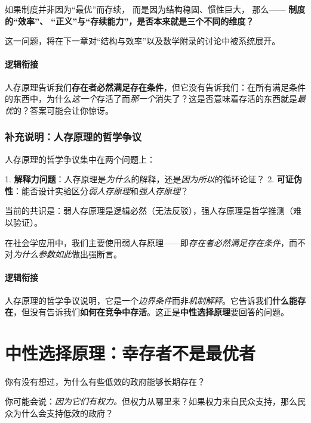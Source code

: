 \documentclass[openany, a4paper, 12pt]{book}
\begin{document}
	如果制度并非因为“最优”而存续，  
	而是因为结构稳固、惯性巨大，  
	那么——  
	\textbf{制度的“效率”、 “正义”与“存续能力”，是否本来就是三个不同的维度？}
	
	这一问题，将在下一章对“结构与效率”以及数学附录的讨论中被系统展开。
	
	

	\paragraph*{逻辑衔接}
	人存原理告诉我们\textbf{存在者必然满足存在条件}，但它没有告诉我们：在所有满足条件的东西中，为什么\textit{这一个}存活了而\textit{那一个}消失了？这是否意味着存活的东西就是\textit{最优}的？答案可能会让你惊讶。

	\subsubsection*{补充说明：人存原理的哲学争议}
	\begin{tcolorbox}[
		colback=gray!5,
		colframe=gray!40,
		title=\small \textit{哲学澄清（可跳过）},
		fonttitle=\bfseries
		]
		\small
		人存原理的哲学争议集中在两个问题上：

		1. \textbf{解释力问题}：人存原理是\textit{为什么}的解释，还是\textit{因为所以}的循环论证？
		2. \textbf{可证伪性}：能否设计实验区分\textit{弱人存原理}和\textit{强人存原理}？

		当前的共识是：弱人存原理是逻辑必然（无法反驳），强人存原理是哲学推测（难以验证）。

		在社会学应用中，我们主要使用弱人存原理——即\textit{存在者必然满足存在条件}，而不对\textit{为什么参数如此}做出强断言。
	\end{tcolorbox}

	\paragraph*{逻辑衔接}
	人存原理的哲学争议说明，它是一个\textit{边界条件}而非\textit{机制解释}。它告诉我们\textbf{什么能存在}，但没有告诉我们\textbf{如何在竞争中存活}。这正是\textbf{中性选择原理}要回答的问题。

	\section{中性选择原理：幸存者不是最优者}

	你有没有想过，为什么有些低效的政府能够长期存在？

	你可能会说：\textit{因为它们有权力。}但权力从哪里来？如果权力来自民众支持，那么民众为什么会支持低效的政府？
\end{document}
